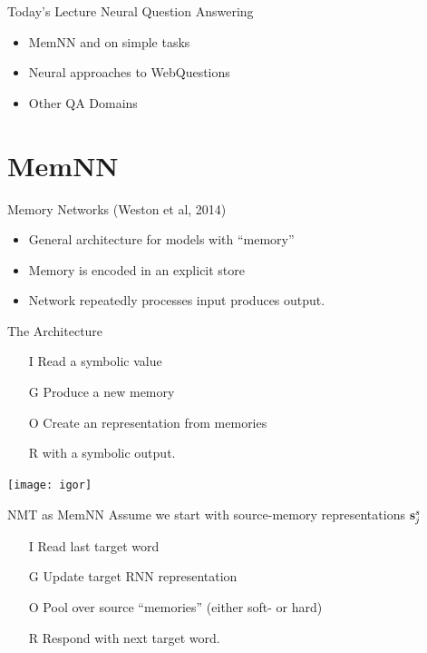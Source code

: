 \documentclass{beamer}
\begin{document}
\begin{frame}{Today's Lecture}
  Neural Question Answering 
  \air

  \begin{itemize}
  \item MemNN and on simple tasks
    \air
  \item Neural approaches to WebQuestions
    \air 
    
  \item Other QA Domains
  \end{itemize}  
\end{frame}


\section{MemNN}



\begin{frame}{Memory Networks (Weston et al, 2014)}
  \begin{itemize}
  \item General architecture for models with ``memory''
    \air
  \item Memory is encoded in an explicit store
    \air
  \item Network repeatedly processes input produces output.
  \end{itemize}
\end{frame}

\begin{frame}{The Architecture}
  \begin{itemize}
  \item[I] Read a symbolic  value
  \item[G] Produce a new  memory 
  \item[O] Create an  representation from memories 
  \item[R]  with a symbolic output.
  \end{itemize}
  \begin{center}
    \texttt{[image: igor]}
  \end{center}
\end{frame}

\begin{frame}{NMT as MemNN}
  Assume we start with source-memory representations $\mathbf{s}^s_j$ 
  \begin{itemize}
  \item[I] Read last target word
  \item[G] Update target RNN representation
  \item[O] Pool over source ``memories'' (either soft- or hard)
  \item[R] Respond with next target word.
  \end{itemize}
\end{frame}
\end{document}
